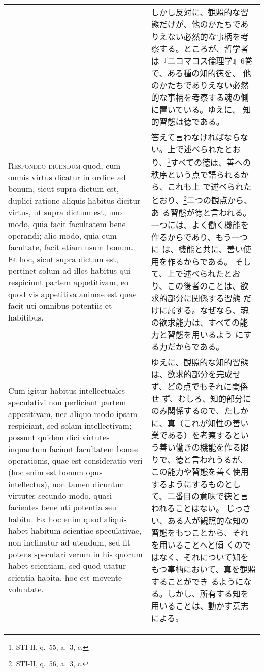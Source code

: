 \documentclass[10pt]{jsarticle} %
\begin{document}
\begin{longtable}{p{21em}p{21em}}
&

しかし反対に、観照的な習態だけが、他のかたちでありえない必然的な事柄を考
 察する。ところが、哲学者は『ニコマコス倫理学』6巻で、ある種の知的徳を、
 他のかたちでありえない必然的な事柄を考察する魂の側に置いている。ゆえに、
 知的習態は徳である。


\\




{\scshape Respondeo dicendum} quod, cum omnis virtus
 dicatur in ordine ad bonum, sicut supra dictum est, duplici ratione
 aliquis habitus dicitur virtus, ut supra dictum est, uno modo, quia
 facit facultatem bene operandi; alio modo, quia cum facultate, facit
 etiam usum bonum. Et hoc, sicut supra dictum est, pertinet solum ad
 illos habitus qui respiciunt partem appetitivam, eo quod vis appetitiva
 animae est quae facit uti omnibus potentiis et habitibus. 

&

答えて言わなければならない。上で述べられたとおり、\footnote{STI-II,
q.~55, a.~3, c.}すべての徳は、善への秩序という点で語られるから、これも上
で述べられたとおり、\footnote{STI-II, q.~56, a.~3, c.}二つの観点から、あ
る習態が徳と言われる。一つには、よく働く機能を作るからであり、もう一つに
は、機能と共に、善い使用を作るからである。
そして、上で述べられたとおり、この後者のことは、欲求的部分に関係する習態
 だけに属する。なぜなら、魂の欲求能力は、すべての能力と習態を用いるよう
 にする力だからである。


\\



Cum igitur
 habitus intellectuales speculativi non perficiant partem appetitivam,
 nec aliquo modo ipsam respiciant, sed solam intellectivam; possunt
 quidem dici virtutes inquantum faciunt facultatem bonae operationis,
 quae est consideratio veri (hoc enim est bonum opus intellectus), non
 tamen dicuntur virtutes secundo modo, quasi facientes bene uti potentia
 seu habitu. Ex hoc enim quod aliquis habet habitum scientiae
 speculativae, non inclinatur ad utendum, sed fit potens speculari verum
 in his quorum habet scientiam, sed quod utatur scientia habita, hoc est
 movente voluntate. 

&

ゆえに、観照的な知的習態は、欲求的部分を完成せず、どの点でもそれに関係せ
 ず、むしろ、知的部分にのみ関係するので、たしかに、真（これが知性の善い
 業である）を考察するという善い働きの機能を作る限りで、徳と言われうるが、
 この能力や習態を善く使用するようにするものとして、二番目の意味で徳と言
 われることはない。
じっさい、ある人が観照的な知の習態をもつことから、それを用いることへと傾
 くのではなく、それについて知をもつ事柄において、真を観照することができ
 るようになる。しかし、所有する知を用いることは、動かす意志による。


\end{longtable}
\end{document}
